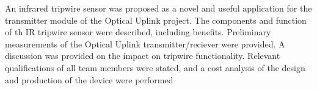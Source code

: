 
An infrared tripwire sensor was proposed as a novel and useful application for the transmitter module of the Optical Uplink project. The components and function of th IR tripwire sensor were described, including benefits. Preliminary measurements of the Optical Uplink transmitter/reciever were provided. A discussion was provided on the impact on tripwire functionality. Relevant qualifications of all team members were stated, and a cost analysis of the design and production of the device were performed



